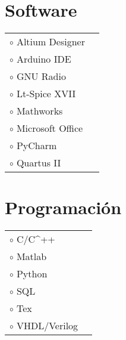 \documentclass[a4paper,10pt]{article}
\begin{document}
\begin{adjustbox}{valign=t}
\begin{minipage}{0.60\textwidth}
\begin{multicols}{2}
\section*{Software}
\begin{tabular}{ll}
\textcolor{ColorOne}{$\circ$}	Altium Designer     & \\
\textcolor{ColorOne}{$\circ$}	Arduino IDE 		& \\
\textcolor{ColorOne}{$\circ$}	GNU Radio 	        & \\
\textcolor{ColorOne}{$\circ$}	Lt-Spice XVII    	& \\
\textcolor{ColorOne}{$\circ$}	Mathworks 	        & \\
\textcolor{ColorOne}{$\circ$}	Microsoft Office 	& \\
\textcolor{ColorOne}{$\circ$}	PyCharm	            & \\
\textcolor{ColorOne}{$\circ$}	Quartus II        	& \\
\end{tabular}
\vfill\null \columnbreak 
\section*{Programación}
\begin{tabular}{ll}
\textcolor{ColorOne}{$\circ$}	C/C^{++}        & 
	\\

\textcolor{ColorOne}{$\circ$}	Matlab 	    	& 
	\\

\textcolor{ColorOne}{$\circ$}		Python    	&
		\\
\textcolor{ColorOne}{$\circ$}	SQL    	& 
	\\
\textcolor{ColorOne}{$\circ$}		Tex 	    & 
	\\
\textcolor{ColorOne}{$\circ$}	VHDL/Verilog 	& 
\end{tabular}
\end{multicols}
\end{minipage}
\end{adjustbox}
\end{document}
